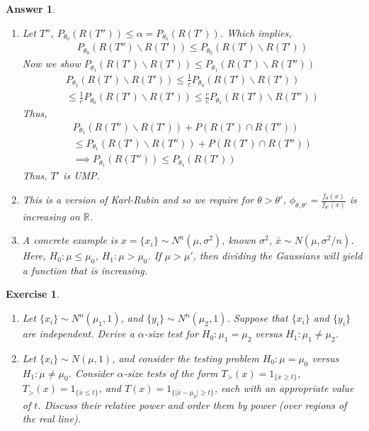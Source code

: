 \documentclass[12pt]{article}
\theoremstyle{colon}
\newtheorem{exercise}{Exercise}
\newtheorem*{answer}{Answer}
\begin{document}
\begin{answer}
  \leavevmode
  \begin{enumerate}[label=\arabic*)]
    \item Let $T''$, $P_{\theta_0}(R(T'')) \leq \alpha = P_{\theta_0}(R(T'))$. Which implies,
      \begin{gather*}
        P_{\theta_0}(R(T'') \backslash R(T')) \leq P_{\theta_0}(R(T') \backslash R(T'))
      \end{gather*}
      Now we show $P_{\theta_1}(R(T') \backslash R(T')) \leq P_{\theta_1}(R(T') \backslash R(T''))$
      \begin{gather*}
        P_{\theta_1}(R(T') \backslash R(T')) \leq \frac{1}{c} P_{\theta_0}(R(T') \backslash R(T')) \\
        \leq \frac{1}{c} P_{\theta_0}(R(T') \backslash R(T')) \leq \frac{c}{c} P_{\theta_1}(R(T') \backslash R(T''))
      \end{gather*}
      Thus,
      \begin{gather*}
        P_{\theta_1}(R(T'') \backslash R(T')) + P(R(T') \cap R(T'')) \\
        \leq P_{\theta_1}(R(T') \backslash R(T'')) + P(R(T') \cap R(T'')) \\
        \implies P_{\theta_1}(R(T'')) \leq P_{\theta_1}(R(T'))
      \end{gather*}
      Thus, $T'$ is UMP.
    \item This is a version of Karl-Rubin and so we require for $\theta > \theta'$, $\phi_{\theta, \theta'} = \frac{f_\theta(x)}{f_{\theta'}(x)}$ is increasing on $\mathbb{R}$.
    \item A concrete example is $x = \{ x_i \} \sim N^n(\mu, \sigma^2)$, known $\sigma^2$, $\bar{x} \sim N(\mu, \sigma^2/n)$. Here, $H_0 : \mu \leq \mu_0$, $H_1 : \mu > \mu_0$. If $\mu > \mu'$, then dividing the Gaussians will yield a function that is increasing.
  \end{enumerate}
\end{answer}

\clearpage

\begin{exercise}
  \leavevmode
  \begin{enumerate}[label=\arabic*)]
    \item Let $\{ x_i \} \sim N^n(\mu_1, 1)$, and $\{ y_i \} \sim N^n(\mu_2, 1)$. Suppose that $\{ x_i \}$ and $\{ y_i \}$ are independent. Derive a $\alpha$-size test for $H_0 : \mu_1 = \mu_2$ versus $H_1 : \mu_1 \neq \mu_2$.
    \item Let $\{ x_i \} \sim N(\mu,1)$, and consider the testing problem $H_0 : \mu = \mu_0$ versus $H_1 : \mu \neq \mu_0$. Consider $\alpha$-size tests of the form $T_> (x) = 1_{\{ \bar{x} \geq t \}}$, $T_>(x) = 1_{\{ \bar{x} \leq t \}}$, and $T(x) = 1_{\{ \lvert \bar{x} - \mu_0 \rvert \geq t \}}$, each with an appropriate value of $t$. Discuss their relative power and order them by power (over regions of the real line).
  \end{enumerate}
\end{exercise}
\end{document}
